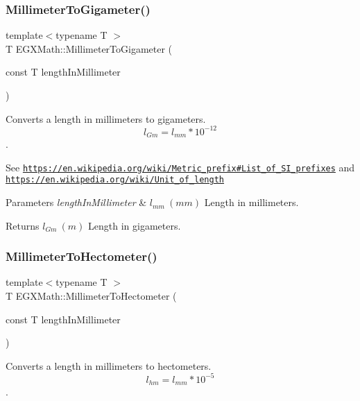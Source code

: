 \subsubsection{\texorpdfstring{Millimeter\+To\+Gigameter()}{MillimeterToGigameter()}}
{\footnotesize\ttfamily template$<$typename T $>$ \\
T E\+G\+X\+Math\+::\+Millimeter\+To\+Gigameter (\begin{DoxyParamCaption}\item[{const T}]{length\+In\+Millimeter }\end{DoxyParamCaption})}



Converts a length in millimeters to gigameters. \[ l_{Gm}=l_{mm} * 10^{-12} \]. 

See \href{https://en.wikipedia.org/wiki/Metric_prefix#List_of_SI_prefixes}{\tt https\+://en.\+wikipedia.\+org/wiki/\+Metric\+\_\+prefix\#\+List\+\_\+of\+\_\+\+S\+I\+\_\+prefixes} and \href{https://en.wikipedia.org/wiki/Unit_of_length}{\tt https\+://en.\+wikipedia.\+org/wiki/\+Unit\+\_\+of\+\_\+length} 
\begin{DoxyParams}{Parameters}
{\em length\+In\+Millimeter} & $ l_{mm}\ (mm)$ Length in millimeters. \\
\hline
\end{DoxyParams}
\begin{DoxyReturn}{Returns}
$ l_{Gm}\ (m)$ Length in gigameters. 
\end{DoxyReturn}
\mbox{\label{group___e_g_x_math-_conversions-_length_conversions-_s_i-_millimeter-_s_i_gaa4a0a12379c507ce0ffb4a950174980c}} 
\subsubsection{\texorpdfstring{Millimeter\+To\+Hectometer()}{MillimeterToHectometer()}}
{\footnotesize\ttfamily template$<$typename T $>$ \\
T E\+G\+X\+Math\+::\+Millimeter\+To\+Hectometer (\begin{DoxyParamCaption}\item[{const T}]{length\+In\+Millimeter }\end{DoxyParamCaption})}



Converts a length in millimeters to hectometers. \[ l_{hm}=l_{mm} * 10^{-5} \]. 

